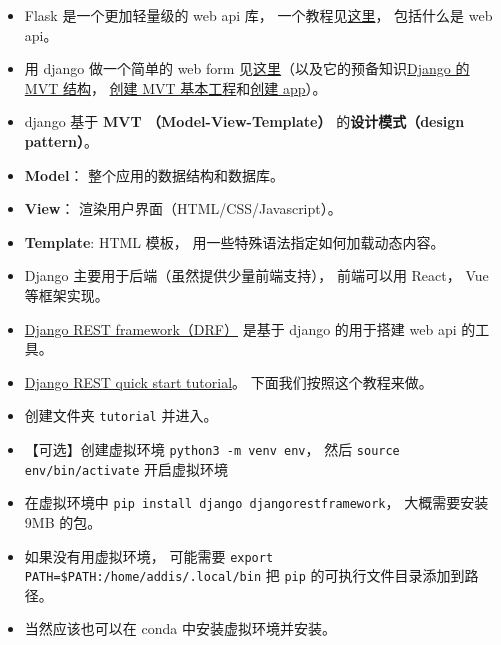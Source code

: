 

\begin{issues}
\issueDraft
\end{issues}

\begin{itemize}
\item Flask 是一个更加轻量级的 web api 库， 一个教程见\href{https://programminghistorian.org/en/lessons/creating-apis-with-python-and-flask}{这里}， 包括什么是 web api。
\item 用 django 做一个简单的 web form 见\href{https://www.geeksforgeeks.org/how-to-create-a-form-using-django-forms/}{这里}（以及它的预备知识\href{https://www.geeksforgeeks.org/django-project-mvt-structure}{Django 的 MVT 结构}， \href{https://www.geeksforgeeks.org/how-to-create-a-basic-project-using-mvt-in-django/}{创建 MVT 基本工程}和\href{https://www.geeksforgeeks.org/how-to-create-an-app-in-django/}{创建 app}）。
\item django 基于 \textbf{MVT （Model-View-Template）} 的\textbf{设计模式（design pattern）}。
\item \textbf{Model}： 整个应用的数据结构和数据库。
\item \textbf{View}： 渲染用户界面（HTML/CSS/Javascript）。
\item \textbf{Template}: HTML 模板， 用一些特殊语法指定如何加载动态内容。
\item Django 主要用于后端（虽然提供少量前端支持）， 前端可以用 React， Vue 等框架实现。
\item \href{https://www.django-rest-framework.org/}{Django REST framework（DRF）} 是基于 django 的用于搭建 web api 的工具。
\item \href{https://www.django-rest-framework.org/tutorial/quickstart/}{Django REST quick start tutorial}。 下面我们按照这个教程来做。
\item 创建文件夹 \verb|tutorial| 并进入。
\item 【可选】创建虚拟环境 \verb|python3 -m venv env|， 然后 \verb|source env/bin/activate| 开启虚拟环境
\item 在虚拟环境中 \verb|pip install django djangorestframework|， 大概需要安装 9MB 的包。
\item 如果没有用虚拟环境， 可能需要 \verb|export PATH=$PATH:/home/addis/.local/bin| 把 \verb|pip| 的可执行文件目录添加到路径。
\item 当然应该也可以在 conda 中安装虚拟环境并安装。

\end{itemize}
